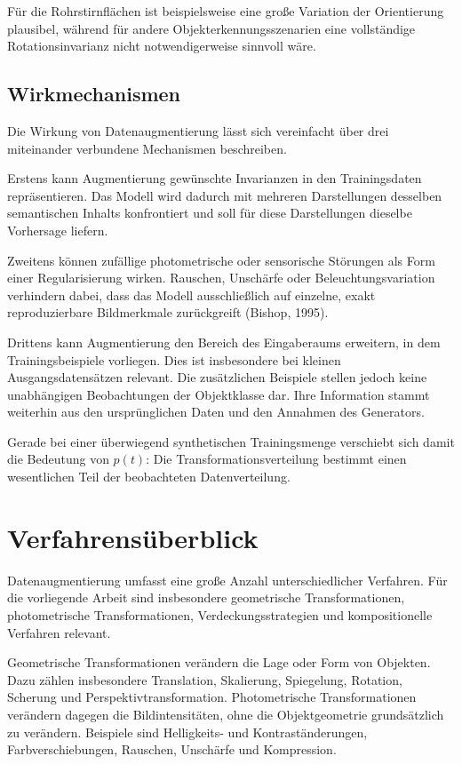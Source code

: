 Für die Rohrstirnflächen ist beispielsweise eine große Variation der Orientierung plausibel, während für andere Objekterkennungsszenarien eine vollständige Rotationsinvarianz nicht notwendigerweise sinnvoll wäre.

\subsection{Wirkmechanismen}

Die Wirkung von Datenaugmentierung lässt sich vereinfacht über drei miteinander verbundene Mechanismen beschreiben.

Erstens kann Augmentierung gewünschte Invarianzen in den Trainingsdaten repräsentieren. Das Modell wird dadurch mit mehreren Darstellungen desselben semantischen Inhalts konfrontiert und soll für diese Darstellungen dieselbe Vorhersage liefern.

Zweitens können zufällige photometrische oder sensorische Störungen als Form einer Regularisierung wirken. Rauschen, Unschärfe oder Beleuchtungsvariation verhindern dabei, dass das Modell ausschließlich auf einzelne, exakt reproduzierbare Bildmerkmale zurückgreift (Bishop, 1995).

Drittens kann Augmentierung den Bereich des Eingaberaums erweitern, in dem Trainingsbeispiele vorliegen. Dies ist insbesondere bei kleinen Ausgangsdatensätzen relevant. Die zusätzlichen Beispiele stellen jedoch keine unabhängigen Beobachtungen der Objektklasse dar. Ihre Information stammt weiterhin aus den ursprünglichen Daten und den Annahmen des Generators.

Gerade bei einer überwiegend synthetischen Trainingsmenge verschiebt sich damit die Bedeutung von $p(t)$: Die Transformationsverteilung bestimmt einen wesentlichen Teil der beobachteten Datenverteilung.

\section{Verfahrensüberblick}

Datenaugmentierung umfasst eine große Anzahl unterschiedlicher Verfahren. Für die vorliegende Arbeit sind insbesondere geometrische Transformationen, photometrische Transformationen, Verdeckungsstrategien und kompositionelle Verfahren relevant.

Geometrische Transformationen verändern die Lage oder Form von Objekten. Dazu zählen insbesondere Translation, Skalierung, Spiegelung, Rotation, Scherung und Perspektivtransformation. Photometrische Transformationen verändern dagegen die Bildintensitäten, ohne die Objektgeometrie grundsätzlich zu verändern. Beispiele sind Helligkeits- und Kontraständerungen, Farbverschiebungen, Rauschen, Unschärfe und Kompression.

